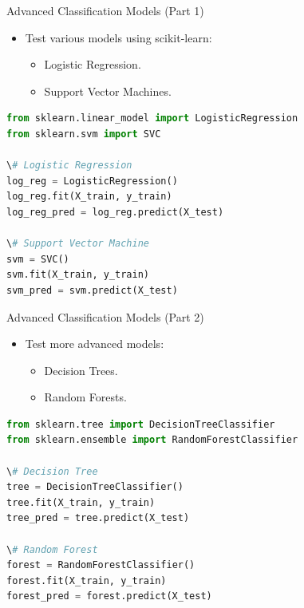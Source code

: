 \documentclass{beamer}
\begin{document}
\begin{frame}{Advanced Classification Models (Part 1)}
\begin{itemize}
    \item Test various models using scikit-learn:
    \begin{itemize}
        \item Logistic Regression.
        \item Support Vector Machines.
    \end{itemize}
\end{itemize}
\begin{lstlisting}[language=Python, caption=Training Logistic Regression and SVM]
from sklearn.linear_model import LogisticRegression
from sklearn.svm import SVC

\# Logistic Regression
log_reg = LogisticRegression()
log_reg.fit(X_train, y_train)
log_reg_pred = log_reg.predict(X_test)

\# Support Vector Machine
svm = SVC()
svm.fit(X_train, y_train)
svm_pred = svm.predict(X_test)
\end{lstlisting}
\end{frame}

\begin{frame}{Advanced Classification Models (Part 2)}
\begin{itemize}
    \item Test more advanced models:
    \begin{itemize}
        \item Decision Trees.
        \item Random Forests.
    \end{itemize}
\end{itemize}
\begin{lstlisting}[language=Python, caption=Training Decision Trees and Random Forests]
from sklearn.tree import DecisionTreeClassifier
from sklearn.ensemble import RandomForestClassifier

\# Decision Tree
tree = DecisionTreeClassifier()
tree.fit(X_train, y_train)
tree_pred = tree.predict(X_test)

\# Random Forest
forest = RandomForestClassifier()
forest.fit(X_train, y_train)
forest_pred = forest.predict(X_test)
\end{lstlisting}
\end{frame}
\end{document}
